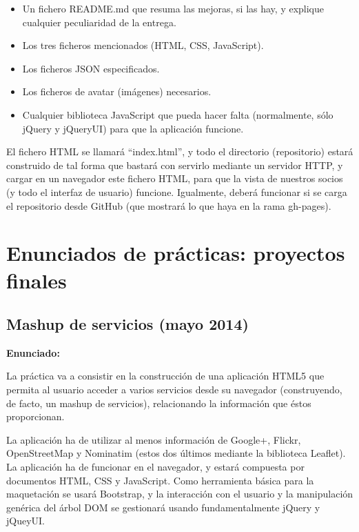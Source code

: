 \begin{itemize}
\item Un fichero README.md que resuma las mejoras, si las hay, y explique cualquier peculiaridad de la entrega.
\item Los tres ficheros mencionados (HTML, CSS, JavaScript).
\item Los ficheros JSON especificados.
\item Los ficheros de avatar (imágenes) necesarios.
\item Cualquier biblioteca JavaScript que pueda hacer falta (normalmente, sólo jQuery y jQueryUI) para que la aplicación funcione.
\end{itemize}

El fichero HTML se llamará ``index.html'', y todo el directorio (repositorio) estará construido de tal forma que bastará con servirlo mediante un servidor HTTP, y cargar en un navegador este fichero HTML, para que la vista de nuestros socios (y todo el interfaz de usuario) funcione. Igualmente, deberá funcionar si se carga el repositorio desde GitHub (que mostrará lo que haya en la rama gh-pages).


\chapter{Enunciados de prácticas: proyectos finales}

\section{Mashup de servicios (mayo 2014)}
\label{sec:final-14-mayo}

\textbf{Enunciado:}

La práctica va a consistir en la construcción de una aplicación HTML5 que permita al usuario acceder a varios servicios desde su navegador (construyendo, de facto, un mashup de servicios), relacionando la información que éstos proporcionan.

La aplicación ha de utilizar al menos información de Google+, Flickr, OpenStreetMap y Nominatim (estos dos últimos mediante la biblioteca Leaflet). La aplicación ha de funcionar en el navegador, y estará compuesta por documentos HTML, CSS y JavaScript. Como herramienta básica para la maquetación se usará Bootstrap, y la interacción con el usuario y la manipulación genérica del árbol DOM se gestionará usando fundamentalmente jQuery y jQueyUI.

